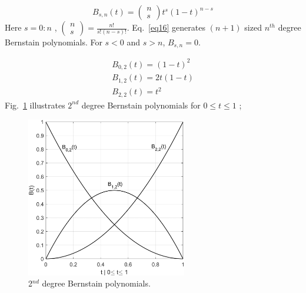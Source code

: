 \documentclass[preprint,10pt,3p]{elsarticle}
\begin{document}
\begin{equation}\label{eq15}
{B_{s,n}}(t) = \left( {\begin{array}{*{20}{c}}
n\\
s
\end{array}} \right){t^s}{\left( {1 - t} \right)^{n - s}}
\end{equation}
Here $ s = 0:n$ , $\left( {\begin{array}{*{20}{c}}n\\s\end{array}} \right) = \frac{{n!}}{{s!\left( {n - s} \right)!}}$. Eq.~\ref{eq16} generates $\left( {n + 1}\right)$  sized  ${n^{th}}$ degree Bernstain polynomials. For $s < 0$ and $s > n$, ${B_{s,n}} = 0$.

\begin{equation}\label{eq16}
\begin{array}{l}
{B_{0,2}}(t) = {(1 - t)^2}\\
{B_{1,2}}(t) = 2t(1 - t)\\
{B_{2,2}}(t) = {t^2}
\end{array}
\end{equation}
Fig.~\ref{figure02} illustrates $2^{nd}$ degree Bernstain \citep{30} polynomials for $0 \le t \le 1$ ;

\begin{figure}[!htp]
  \centering
  \includegraphics[width=7cm]{bezierquadric.eps}
  \caption{2$^{nd }$ degree Bernstain polynomials.}
  \label{figure02}
\end{figure}
\end{document}
